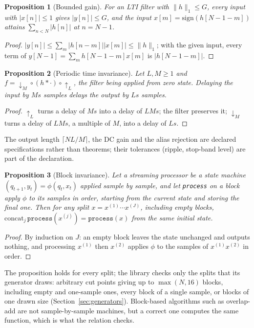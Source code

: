 \documentclass[10pt,conference]{IEEEtran}
\newtheorem{proposition}{Proposition}
\newcommand{\code}[1]{\texttt{#1}}
\begin{document}
\begin{proposition}[Bounded gain] For an LTI filter with $\|h\|_1\le G$,
every input with $|x[n]|\le1$ gives $|y[n]|\le G$, and the input
$x[m]=\mathrm{sign}(h[N-1-m])$ attains $\sum_{n<N}|h[n]|$ at $n=N-1$.\end{proposition}
\begin{proof} $|y[n]|\le\sum_m|h[n-m]||x[m]|\le\|h\|_1$; with the given input,
every term of $y[N-1]=\sum_m h[N-1-m]x[m]$ is $|h[N-1-m]|$.\end{proof}

\begin{proposition}[Periodic time invariance] Let $L,M\ge1$ and
$f=\downarrow_M\circ(h*\cdot)\circ\uparrow_L$, the filter being applied from
zero state. Delaying the input by $Ms$
samples delays the output by $Ls$ samples.\end{proposition}
\begin{proof} $\uparrow_L$ turns a delay of $Ms$ into a delay of $LMs$; the
filter preserves it; $\downarrow_M$ turns a delay of $LMs$, a multiple of $M$,
into a delay of $Ls$.\end{proof}
The output length $\lceil NL/M\rceil$, the DC gain and the alias rejection are
declared specifications rather than theorems; their tolerances (ripple,
stop-band level) are part of the declaration.

\begin{proposition}[Block invariance] Let a streaming processor be a state
machine $(q_{t+1},y_t)=\phi(q_t,x_t)$ applied sample by sample, and let
\code{process} on a block apply $\phi$ to its samples in order, starting from the
current state and storing the final one. Then for any split
$x=x^{(1)}\cdots x^{(J)}$, including empty blocks,
$\mathrm{concat}_j\,\code{process}(x^{(j)})=\code{process}(x)$ from the same
initial state.\end{proposition}
\begin{proof} By induction on $J$: an empty block leaves the state unchanged and
outputs nothing, and processing $x^{(1)}$ then $x^{(2)}$ applies $\phi$ to the
samples of $x^{(1)}x^{(2)}$ in order.\end{proof}
The proposition holds for every split; the library checks only the splits
that its generator draws: arbitrary cut points giving up to $\max(N,16)$
blocks, including empty and one-sample ones, every block of a single sample,
or blocks of one drawn size (Section~\ref{sec:generators}).
Block-based algorithms such as overlap-add are not sample-by-sample machines,
but a correct one computes the same function, which is what the relation checks.
\end{document}
